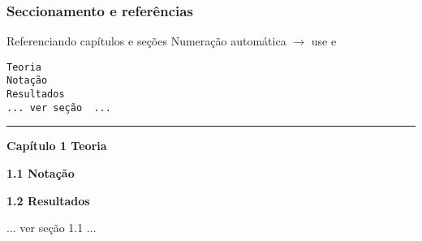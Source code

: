 \begin{frame}
  \frametitle{Seccionamento e referências}

  \begin{block}{Referenciando capítulos e seções}
    Numeração automática $\to$ use \texttt{\purple{\string\label}} e \texttt{\purple{\string\ref}}
  \end{block}

  \begin{exemplo}
    \texttt{\blue{\string\chapter}\ac{}Teoria\fc{}\ \\
      \blue{\string\section}\ac{}Notação\fc{}\ \\
      \blue{\string\section}\ac{}Resultados\fc{}\ \\
    ...\ ver\ seção\ \ ...}

  \medskip\hrule\bigskip
  \setlength{\parindent}{0pt}
    \textbf{\large Capítulo 1 Teoria}\smallskip\par
    \textbf{1.1 Notação}\par
    \textbf{1.2 Resultados}\par
    ... ver seção 1.1 ...
  \end{exemplo}

\end{frame}

